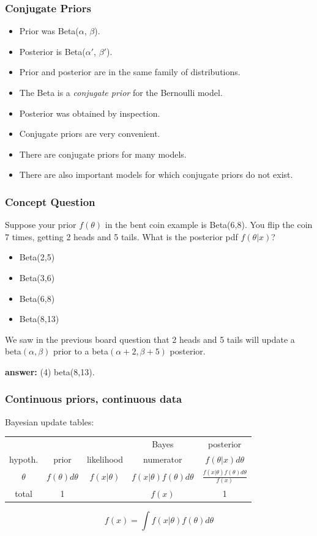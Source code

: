 \documentclass[12pt]{beamer}
\begin{document}
\begin{frame}
	\frametitle{Conjugate Priors}
	
	\begin{itemize}[label={\color{blue}$\blacktriangleright$}]
		\item Prior was Beta($\alpha$, $\beta$).
		\item Posterior is Beta($\alpha'$, $\beta'$).
		\item Prior and posterior are in the same family of distributions.
		\item The Beta is a \textit{conjugate prior} for the Bernoulli model.
		\item Posterior was obtained by inspection.
		\item Conjugate priors are very convenient.
		\item There are conjugate priors for many models.
		\item There are also important models for which conjugate priors do not exist.
	\end{itemize}
	
\end{frame}
\begin{frame}
	\frametitle{Concept Question}
	
	Suppose your prior $f(\theta)$ in the bent coin example is Beta(6,8). You flip the coin 7 times, getting 2 heads and 5 tails. What is the posterior pdf $f(\theta|x)$?
	
	\begin{itemize}[label={\color{blue}$\blacktriangleright$}]
		\item Beta(2,5)
		\item Beta(3,6)
		\item Beta(6,8)
		\item Beta(8,13)
	\end{itemize}
	
	We saw in the previous board question that 2 heads and 5 tails will update a beta$(\alpha,\beta)$ prior to a beta$(\alpha+2,\beta+5)$ posterior.
	
	\medskip
	\textbf{answer:} (4) beta(8,13).
	
\end{frame}
\begin{frame}
	\frametitle{Continuous priors, continuous data}
	
	Bayesian update tables:
	\begin{center}
		\begin{tabular}{ccccc}
			\toprule
			& & & Bayes & posterior \\
			hypoth. & prior & likelihood & numerator & $f(\theta|x) d\theta$ \\
			\midrule
			$\theta$ & $f(\theta) d\theta$ & $f(x|\theta)$ & $f(x|\theta)f(\theta) d\theta$ & $\frac{f(x|\theta)f(\theta) d\theta}{f(x)}$ \\
			\midrule
			total & 1 & & $f(x)$ & 1 \\
			\bottomrule
		\end{tabular}
	\end{center}
	
	\[ f(x) = \int f(x|\theta)f(\theta) d\theta \]
	
\end{frame}
\end{document}
